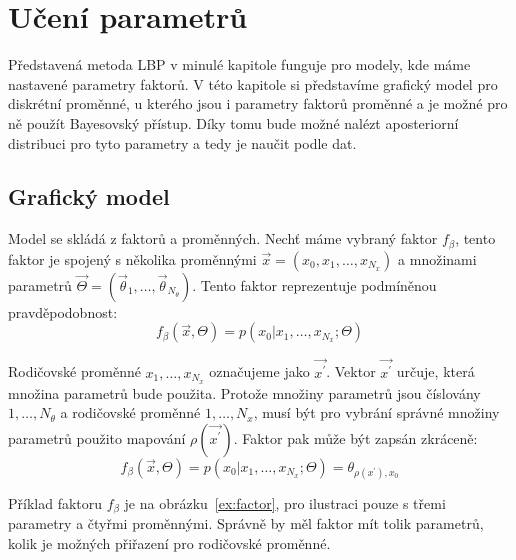 \chapter{Učení parametrů}
\label{ch:ep}

Představená metoda LBP v minulé kapitole funguje pro modely, kde máme nastavené parametry faktorů.
V této kapitole si představíme grafický model pro diskrétní proměnné, u kterého jsou i parametry faktorů proměnné a je možné pro ně použít Bayesovský přístup.
Díky tomu bude možné nalézt aposteriorní distribuci pro tyto parametry a tedy je naučit podle dat.

\section{Grafický model}

Model se skládá z faktorů a proměnných.
Nechť máme vybraný faktor $f_\beta$, tento faktor je spojený s několika proměnnými
$\vec{x} = (x_0, x_1, \dots, x_{N_x})$
a množinami parametrů
$\vec{\Theta} = (\vec{\theta}_1, \dots, \vec{\theta}_{N_\theta})$.
Tento faktor reprezentuje podmíněnou pravděpodobnost:
$$f_\beta(\vec{x}, \Theta) = p(x_0 | x_1, \dots, x_{N_x}; \Theta)$$

Rodičovské proměnné $x_1, \dots, x_{N_x}$ označujeme jako $\vec{x^\prime}$.
Vektor $\vec{x^\prime}$ určuje, která množina parametrů bude použita.
Protože množiny parametrů jsou číslovány $1, \dots, N_\theta$ a rodičovské
proměnné $1, \dots, N_x$, musí být pro vybrání správné množiny parametrů
použito mapování $\rho(\vec{x^\prime})$.
Faktor pak může být zapsán zkráceně:
$$f_\beta(\vec{x}, \Theta) = p(x_0 | x_1, \dots, x_{N_x}; \Theta) =
\theta_{\rho(x^\prime), x_0}$$

Příklad faktoru $f_\beta$ je na obrázku~\ref{ex:factor}, pro ilustraci pouze s třemi parametry a čtyřmi proměnnými.
Správně by měl faktor mít tolik parametrů, kolik je možných přiřazení pro rodičovské proměnné.

